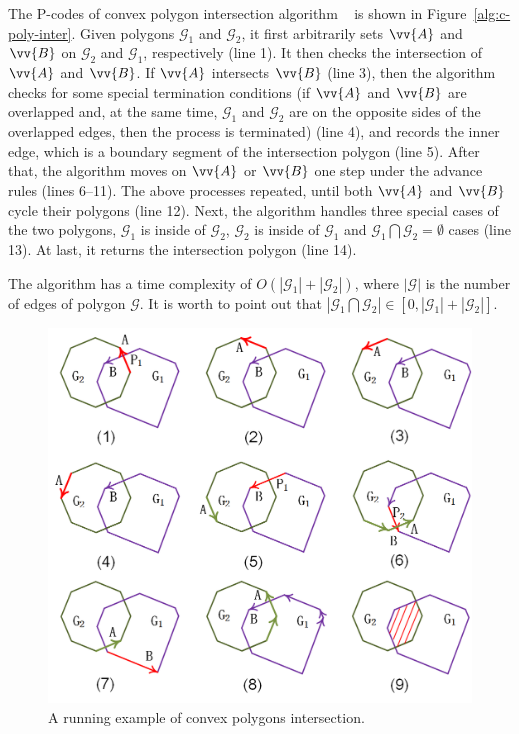 The P-codes of convex polygon intersection algorithm ~\cite{ORourke:Intersection} is shown in Figure~\ref{alg:c-poly-inter}.
Given polygons $\mathcal{G}_1$ and $\mathcal{G}_2$, it first arbitrarily sets $\vv{A}$ and $\vv{B}$ on $\mathcal{G}_2$ and $\mathcal{G}_1$, respectively (line 1).
%
It then checks the intersection of $\vv{A}$ and $\vv{B}$. If $\vv{A}$ intersects $\vv{B}$ (line 3), then the algorithm checks for some special termination conditions (\eg if $\vv{A}$ and $\vv{B}$ are overlapped and, at the same time, $\mathcal{G}_1$ and $\mathcal{G}_2$ are on the opposite sides of the overlapped edges, then the process is terminated) (line 4), and records the inner edge, which is a boundary segment of the intersection polygon (line 5).
After that, the algorithm moves on $\vv{A}$ or $\vv{B}$ one step under the advance rules (lines 6--11).
The above processes repeated, until both $\vv{A}$ and $\vv{B}$ cycle their polygons (line 12).
%
Next, the algorithm handles three special cases of the two polygons, \ie $\mathcal{G}_1$ is inside of $\mathcal{G}_2$, $\mathcal{G}_2$ is inside of $\mathcal{G}_1$ and $\mathcal{G}_1 \bigcap \mathcal{G}_2 = \emptyset$ cases (line 13).
%
At last, it returns the intersection polygon (line 14).

The algorithm has a time complexity of $O(|\mathcal{G}_1| + |\mathcal{G}_2|)$, where $|\mathcal{G}|$ is the number of edges of polygon $\mathcal{G}$.
It is worth to point out that $|\mathcal{G}_1 \bigcap \mathcal{G}_2| \in [0, |\mathcal{G}_1| + |\mathcal{G}_2|]$.


\begin{figure}[tb!]
\centering
\includegraphics[scale=0.88]{figures/Fig-convex-poly-inter.png}
\vspace{-2ex}
\caption{\small A running example of convex polygons intersection.}
\vspace{-1ex}
\label{fig:c-poly-inter}
\end{figure}



